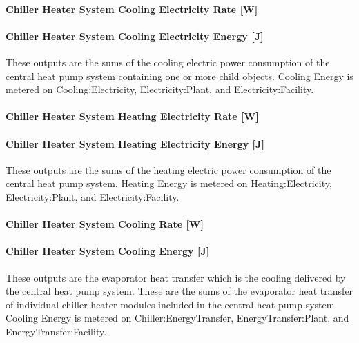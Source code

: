 \paragraph{Chiller Heater System Cooling Electricity Rate {[}W{]}}\label{chiller-heater-system-cooling-electric-power-w}

\paragraph{Chiller Heater System Cooling Electricity Energy {[}J{]}}\label{chiller-heater-system-cooling-electric-energy-j}

These outputs are the sums of the cooling electric power consumption of the central heat pump system containing one or more child objects. Cooling Energy is metered on Cooling:Electricity, Electricity:Plant, and Electricity:Facility.

\paragraph{Chiller Heater System Heating Electricity Rate {[}W{]}}\label{chiller-heater-system-heating-electric-power-w}

\paragraph{Chiller Heater System Heating Electricity Energy {[}J{]}}\label{chiller-heater-system-heating-electric-energy-j}

These outputs are the sums of the heating electric power consumption of the central heat pump system. Heating Energy is metered on Heating:Electricity, Electricity:Plant, and Electricity:Facility.

\paragraph{Chiller Heater System Cooling Rate {[}W{]}}\label{chiller-heater-system-cooling-rate-w}

\paragraph{Chiller Heater System Cooling Energy {[}J{]}}\label{chiller-heater-system-cooling-energy-j}

These outputs are the evaporator heat transfer which is the cooling delivered by the central heat pump system. These are the sums of the evaporator heat transfer of individual chiller-heater modules included in the central heat pump system. Cooling Energy is metered on Chiller:EnergyTransfer, EnergyTransfer:Plant, and EnergyTransfer:Facility.

